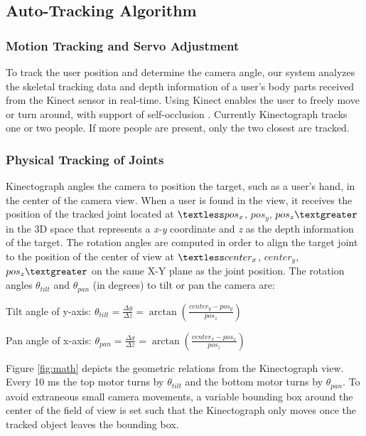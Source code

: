 \subsection{Auto-Tracking Algorithm}

\subsubsection{Motion Tracking and Servo Adjustment}
To track the user position and determine the camera angle, our system analyzes the skeletal tracking data and depth information of a user’s body parts received from the Kinect sensor in real-time. Using Kinect enables the user to freely move or turn around, with support of self-occlusion \cite{Shotton:2011ud}. Currently Kinectograph tracks one or two people. If more people are present, only the two closest are tracked.

\subsubsection{Physical Tracking of Joints}
Kinectograph angles the camera to position the target, such as a user's hand, in the center of the camera view. When a user is found in the view, it receives the position of the tracked joint located at $\textless pos_{x}$, $pos_{y}$, $pos_{z} \textgreater$ in the 3D space that represents a {\em x-y} coordinate and {\em z} as the depth information of the target. The rotation angles are computed in order to align the target joint to the position of the center of view at $\textless center_{x}$, $center_{y}$, $pos_{z}\textgreater$  on the same X-Y plane as the joint position. The rotation angles $\theta_{tilt}$ and $\theta_{pan}$ (in degrees) to tilt or pan the camera are:

Tilt angle of y-axis:
$\theta_{tilt}=\frac{\Delta y}{\Delta z}=\arctan{(\frac{center_{y}-pos_{y}}{pos_{z}})}$

Pan angle of x-axis:
$\theta_{pan}=\frac{\Delta x}{\Delta z}=\arctan{(\frac{center_{x}-pos_{x}}{pos_{z}})}$

Figure \ref{fig:math} depicts the geometric relations from the Kinectograph view. Every 10 ms the top motor turns by $\theta_{tilt}$ and the bottom motor turns by $\theta_{pan}$. To avoid extraneous small camera movements, a variable bounding box around the center of the field of view is set such that the Kinectograph only moves once the tracked object leaves the bounding box.

